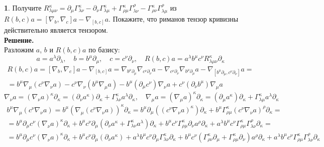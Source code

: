 \documentclass[12pt]{article}
\theoremstyle{definition}
\newtheorem{zad}{}[section]
\begin{document}
\begin{zad}\label{zad3}
Получите $R^\kappa_{\lambda\mu\nu}=\partial_\mu\Gamma^\kappa_{\lambda\nu}-\partial_\nu\Gamma^\kappa_{\lambda\mu}+\Gamma^\kappa_{\rho\mu}\Gamma^\rho_{\lambda\nu}-\Gamma^\kappa_{\rho\nu}\Gamma^\rho_{\lambda\mu}$ из $R(b,c)a=[\nabla_b,\nabla_c]a-\nabla_{[b,c]}a$. Покажите, что риманов тензор кривизны действительно является тензором.\\
\textbf{Решение.}\\
Разложим $a$, $b$ и $R(b,c)a$ по базису:
\begin{equation}
    a=a^\lambda\partial_\lambda,\quad b=b^\mu\partial_\mu,\quad c=c^\nu\partial_\nu, \quad R(b,c)a=a^\lambda b^\mu c^\nu R^\kappa_{\lambda\mu\nu}\partial_\kappa
\end{equation}
\begin{multline}
    R(b,c)a=[\nabla_b,\nabla_c]a-\nabla_{[b,c]}a=\nabla_{b^\mu\partial_\mu}\nabla_{c^\nu\partial_\nu} a-\nabla_{c^\nu\partial_\nu}\nabla_{b^\mu\partial_\mu}a-\nabla_{[b^\mu\partial_\mu,c^\nu\partial_\nu]}a=\\=b^\mu\nabla_\mu(c^\nu\nabla_\nu a)-c^\nu\nabla_\nu(b^\mu\nabla_\mu a)-b^\mu(\partial_\mu c^\nu)\nabla_\nu a+c^\nu(\partial_\nu b^\mu)\nabla_\mu a
\end{multline}
\begin{equation}
    \nabla_\nu a=(\nabla_\nu a)^\kappa\partial_\kappa=(\partial_\nu a^\kappa)\partial_\kappa+\Gamma^\kappa_{\lambda\nu}a^\lambda\partial_\kappa,\quad \nabla_\mu a=(\nabla_\mu a)^\kappa\partial_\kappa=(\partial_\mu a^\kappa)\partial_\kappa+\Gamma^\kappa_{\lambda\mu}a^\lambda\partial_\kappa
\end{equation}
\begin{multline*}
    b^\mu\nabla_\mu(c^\nu\nabla_\nu a)=b^\mu(\nabla_\mu (c^\nu\nabla_\nu a))^\kappa\partial_\kappa=b^\mu\partial_\mu((c^\nu\nabla_\nu a)^\kappa)\partial_\kappa+b^\mu\Gamma^\kappa_{\rho\mu}(c^\nu\nabla_\nu a)^\rho\partial_\kappa=\\=b^\mu\partial_\mu c^\nu(\nabla_\nu a)^\kappa\partial_\kappa+b^\mu c^\nu\partial_\mu(\partial_\nu a^\kappa+\Gamma^\kappa_{\lambda\nu}a^\lambda)\partial_\kappa+b^\mu c^\nu\Gamma^\kappa_{\rho\mu}\partial_\nu a^\rho\partial_\kappa+a^\lambda b^\mu c^\nu\Gamma^\kappa_{\rho\mu}\Gamma^\rho_{\lambda\nu}\partial_\kappa=\\=b^\mu\partial_\mu c^\nu(\nabla_\nu a)^\kappa\partial_\kappa+b^\mu c^\nu\partial_\mu(\partial_\nu a^\kappa)+a^\lambda b^\mu c^\nu\partial_\mu\Gamma^\kappa_{\lambda\nu}\partial_\kappa+b^\mu c^\nu(\Gamma^\kappa_{\rho\nu}\partial_\mu+\Gamma^\kappa_{\rho\mu}\partial_\nu)a^\rho\partial_\kappa+a^\lambda b^\mu c^\nu\Gamma^\kappa_{\rho\mu}\Gamma^\rho_{\lambda\nu}\partial_\kappa

\end{multline*}
\end{zad}
\end{document}
